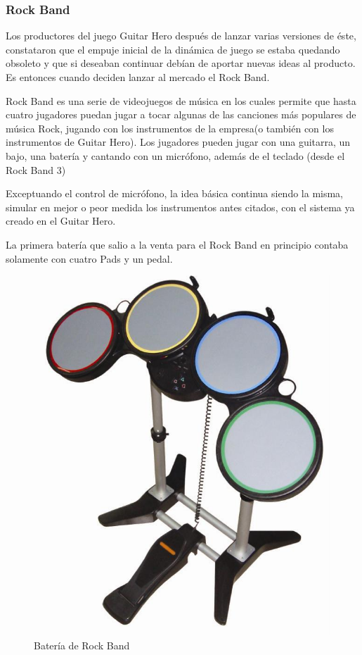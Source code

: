 \documentclass[a4paper,11pt,oneside]{book}
\begin{document}
\subsubsection{Rock Band}

Los productores del juego \gls{Guitar Hero} después de lanzar varias versiones de éste, constataron que el empuje inicial de la dinámica de juego se estaba quedando obsoleto y que si deseaban continuar debían de aportar nuevas ideas al producto. Es entonces cuando deciden lanzar al mercado el \gls{Rock Band}.

\gls{Rock Band} es una serie de videojuegos de música en los cuales permite que hasta cuatro jugadores puedan jugar a tocar algunas de las canciones más populares de música Rock, jugando con los instrumentos de la empresa(o también con los instrumentos de \gls{Guitar Hero}). Los jugadores pueden jugar con una guitarra, un bajo, una batería y cantando con un micrófono, además de el teclado (desde el Rock Band 3)

Exceptuando el control de micrófono, la idea básica continua siendo la misma, simular en mejor o peor medida los instrumentos antes citados, con el sistema ya creado en el \gls{Guitar Hero}.


La primera batería que salio a la venta para el \gls{Rock Band} en principio contaba solamente con cuatro \gls{Pads} y un pedal.

\begin{figure}[H]
\begin{center}
\includegraphics[scale=0.3]{Imagenes/Drum-Controller-for-Rock-Band.jpg}
\caption{Batería de Rock Band}
\label{Batería de Rock Band}
\end{center}
\end{figure}
\end{document}
